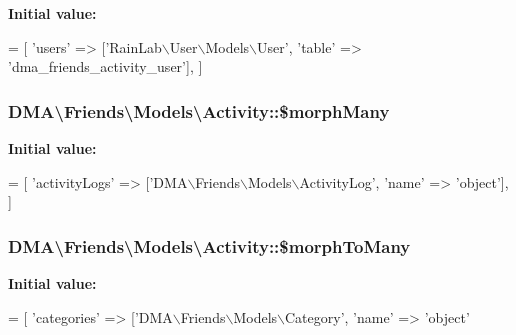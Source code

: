 {\bfseries Initial value\+:}
\begin{DoxyCode}
= [
        \textcolor{stringliteral}{'users'} => [\textcolor{stringliteral}{'RainLab\(\backslash\)User\(\backslash\)Models\(\backslash\)User'}, \textcolor{stringliteral}{'table'} => \textcolor{stringliteral}{'dma\_friends\_activity\_user'}],
    ]
\end{DoxyCode}
\hypertarget{classDMA_1_1Friends_1_1Models_1_1Activity_a192fdaacf609961b7a436d2b967dfd60}{
\subsubsection[{\$morph\+Many}]{\setlength{\rightskip}{0pt plus 5cm}D\+M\+A\textbackslash{}\+Friends\textbackslash{}\+Models\textbackslash{}\+Activity\+::\$morph\+Many}}\label{classDMA_1_1Friends_1_1Models_1_1Activity_a192fdaacf609961b7a436d2b967dfd60}
{\bfseries Initial value\+:}
\begin{DoxyCode}
= [ 
        \textcolor{stringliteral}{'activityLogs'}  => [\textcolor{stringliteral}{'DMA\(\backslash\)Friends\(\backslash\)Models\(\backslash\)ActivityLog'}, \textcolor{stringliteral}{'name'} => \textcolor{stringliteral}{'object'}],
    ]
\end{DoxyCode}
\hypertarget{classDMA_1_1Friends_1_1Models_1_1Activity_a5cfb1d646716be755dcdb6ddb3ab16b1}{
\subsubsection[{\$morph\+To\+Many}]{\setlength{\rightskip}{0pt plus 5cm}D\+M\+A\textbackslash{}\+Friends\textbackslash{}\+Models\textbackslash{}\+Activity\+::\$morph\+To\+Many}}\label{classDMA_1_1Friends_1_1Models_1_1Activity_a5cfb1d646716be755dcdb6ddb3ab16b1}
{\bfseries Initial value\+:}
\begin{DoxyCode}
= [
        \textcolor{stringliteral}{'categories'}    => [\textcolor{stringliteral}{'DMA\(\backslash\)Friends\(\backslash\)Models\(\backslash\)Category'}, \textcolor{stringliteral}{'name'} => \textcolor{stringliteral}{'object'}
\end{DoxyCode}
